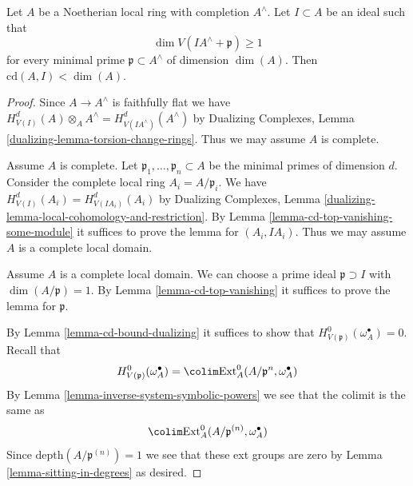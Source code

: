 \begin{proposition}
\label{proposition-Hartshorne-Lichtenbaum-vanishing}
\begin{reference}
\cite[Theorem 3.1]{CD}
\end{reference}
Let $A$ be a Noetherian local ring with completion $A^\wedge$.
Let $I \subset A$ be an ideal such that
$$
\dim V(IA^\wedge + \mathfrak p) \geq 1
$$
for every minimal prime $\mathfrak p \subset A^\wedge$ of dimension $\dim(A)$.
Then $\text{cd}(A, I) < \dim(A)$.
\end{proposition}

\begin{proof}
Since $A \to A^\wedge$ is faithfully flat we have
$H^d_{V(I)}(A) \otimes_A A^\wedge = H^d_{V(IA^\wedge)}(A^\wedge)$
by Dualizing Complexes, Lemma \ref{dualizing-lemma-torsion-change-rings}.
Thus we may assume $A$ is complete.

\medskip\noindent
Assume $A$ is complete. Let $\mathfrak p_1, \ldots, \mathfrak p_n \subset A$
be the minimal primes of dimension $d$. Consider the complete local ring
$A_i = A/\mathfrak p_i$. We have $H^d_{V(I)}(A_i) = H^d_{V(IA_i)}(A_i)$
by Dualizing Complexes, Lemma
\ref{dualizing-lemma-local-cohomology-and-restriction}.
By Lemma \ref{lemma-cd-top-vanishing-some-module}
it suffices to prove the lemma for $(A_i, IA_i)$.
Thus we may assume $A$ is a complete local domain.

\medskip\noindent
Assume $A$ is a complete local domain. We can choose a prime ideal
$\mathfrak p \supset I$ with $\dim(A/\mathfrak p) = 1$.
By Lemma \ref{lemma-cd-top-vanishing}
it suffices to prove the lemma for $\mathfrak p$.

\medskip\noindent
By Lemma \ref{lemma-cd-bound-dualizing} it suffices to show that
$H^0_{V(\mathfrak p)}(\omega_A^\bullet) = 0$.
Recall that
$$
H^0_{V(\mathfrak p)}(\omega_A^\bullet) =
\colim \text{Ext}^0_A(A/\mathfrak p^n, \omega_A^\bullet)
$$
By Lemma \ref{lemma-inverse-system-symbolic-powers}
we see that the colimit is the same as
$$
\colim \text{Ext}^0_A(A/\mathfrak p^{(n)}, \omega_A^\bullet)
$$
Since $\text{depth}(A/\mathfrak p^{(n)}) = 1$ we see that
these ext groups are zero by Lemma \ref{lemma-sitting-in-degrees}
as desired.
\end{proof}